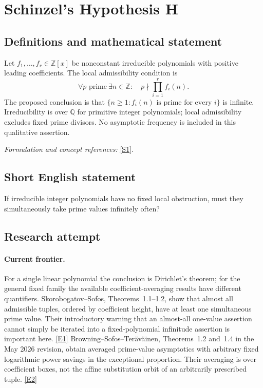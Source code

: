\documentclass[11pt]{article}
\newcommand{\Z}{\mathbb{Z}}
\newcommand{\Q}{\mathbb{Q}}
\newcommand{\sref}[2]{\hyperlink{source:#1:#2}{[S#2]}}
\newcommand{\eref}[2]{\hyperlink{extra:#1:#2}{[E#2]}}
\newif\ifshowcatalogue
\newcommand{\cataloguescope}[1]{\ifshowcatalogue
 \paragraph{Exact scope in the supplied catalogue.}
 \begin{quote}\small #1\end{quote}\fi}
\begin{document}
\setcounter{section}{0}
\clearpage
\section*{\texorpdfstring{Schinzel's Hypothesis H}{Schinzel's Hypothesis H}}\label{statement}
\subsection{Definitions and mathematical statement}
Let $f_1,\ldots,f_r\in\Z[x]$ be nonconstant irreducible polynomials with positive leading coefficients. The local admissibility condition is
\[
 \forall p\text{ prime}\ \exists n\in\Z:\quad p\nmid\prod_{i=1}^r f_i(n).
\]
The proposed conclusion is that $\{n\ge1:f_i(n)\text{ is prime for every }i\}$ is infinite. Irreducibility is over $\Q$ for primitive integer polynomials; local admissibility excludes fixed prime divisors. No asymptotic frequency is included in this qualitative assertion.
\par\smallskip\textit{Formulation and concept references:} \sref{statement}{1}.
\cataloguescope{Let f1,...,fr in Z[x] be irreducible with positive leading coefficients and no prime dividing f1(n)...fr(n) for every n. Prove that infinitely many positive integers n make every fi(n) prime.}
\subsection{Short English statement}
If irreducible integer polynomials have no fixed local obstruction, must they simultaneously take prime values infinitely often?
\subsection{Research attempt}

\paragraph{Current frontier.}
For a single linear polynomial the conclusion is Dirichlet's theorem;
for the general fixed family the available coefficient-averaging results
have different quantifiers. Skorobogatov--Sofos, Theorems~1.1--1.2,
show that almost all admissible tuples, ordered by coefficient height,
have at least one simultaneous prime value. Their introductory warning
that an almost-all one-value assertion cannot simply be iterated into a
fixed-polynomial infinitude assertion is important here. \eref{statement}{1}
Browning--Sofos--Ter\"av\"ainen, Theorems~1.2 and~1.4 in the May 2026
revision, obtain averaged prime-value asymptotics with arbitrary fixed
logarithmic power savings in the exceptional proportion. Their averaging
is over coefficient boxes, not the affine substitution orbit of an
arbitrarily prescribed tuple. \eref{statement}{2}
\end{document}

